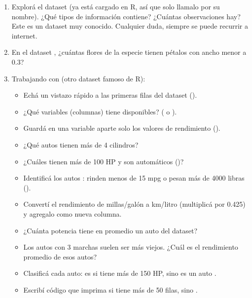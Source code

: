 \documentclass[8pt]{beamer}
\begin{document}
\begin{frame}[fragile]
	\begin{enumerate}[start=9]
		\item Explorá el dataset  (ya est\'a cargado en R, as\'i que solo llamalo por su nombre). ¿Qué tipos de información contiene? ¿Cuántas observaciones hay? Este es un dataset muy conocido. Cualquier duda, siempre se puede recurrir a internet.
		
		\item En el dataset , ¿cuántas flores de la especie   tienen pétalos con ancho menor a 0.3?
		
		\item Trabajando con  (otro dataset famoso de R):
		\begin{itemize}
			\item Echá un vistazo rápido a las primeras filas del dataset ().
			\item ¿Qué variables (columnas) tiene disponibles? ( o ).
			\item Guardá en una variable aparte solo los valores de rendimiento ().
			\item ¿Qué autos tienen más de 4 cilindros?
			\item ¿Cuáles tienen más de 100 HP y son automáticos ()?
			\item Identificá los autos  : rinden menos de 15 mpg o pesan más de 4000 libras ().
			\item Convertí el rendimiento de millas/galón a km/litro (multiplicá  por 0.425) y agregalo como nueva columna.
			\item ¿Cuánta potencia tiene en promedio un auto del dataset?
			\item Los autos con 3 marchas suelen ser más viejos. ¿Cuál es el rendimiento promedio de esos autos?
			\item Clasificá cada auto: es   si tiene más de 150 HP, sino es un auto .
			\item Escribí código que imprima   si tiene más de 50 filas, sino .
		\end{itemize}
	\end{enumerate}
\end{frame}
\end{document}
